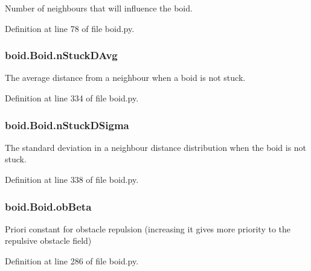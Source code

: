 Number of neighbours that will influence the boid. 



Definition at line 78 of file boid.\-py.

\hypertarget{classboid_1_1Boid_acdfca1dc9b177a512502c6af681bfa9e}{
\subsubsection[{n\-Stuck\-D\-Avg}]{\setlength{\rightskip}{0pt plus 5cm}boid.\-Boid.\-n\-Stuck\-D\-Avg}}\label{classboid_1_1Boid_acdfca1dc9b177a512502c6af681bfa9e}


The average distance from a neighbour when a boid is not stuck. 



Definition at line 334 of file boid.\-py.

\hypertarget{classboid_1_1Boid_add42a1be4f79d1ae8990065fa7e5d4de}{
\subsubsection[{n\-Stuck\-D\-Sigma}]{\setlength{\rightskip}{0pt plus 5cm}boid.\-Boid.\-n\-Stuck\-D\-Sigma}}\label{classboid_1_1Boid_add42a1be4f79d1ae8990065fa7e5d4de}


The standard deviation in a neighbour distance distribution when the boid is not stuck. 



Definition at line 338 of file boid.\-py.

\hypertarget{classboid_1_1Boid_a222ad56335a1e1ea39dd6da9e21797c5}{
\subsubsection[{ob\-Beta}]{\setlength{\rightskip}{0pt plus 5cm}boid.\-Boid.\-ob\-Beta}}\label{classboid_1_1Boid_a222ad56335a1e1ea39dd6da9e21797c5}


Priori constant for obstacle repulsion (increasing it gives more priority to the repulsive obstacle field) 



Definition at line 286 of file boid.\-py.

